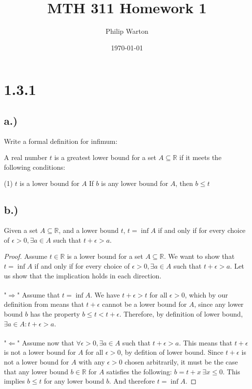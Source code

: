 \documentclass{article}
\begin{document}
\title{MTH 311 Homework 1}
\author{Philip Warton}
\date{\today}
\maketitle
\section*{1.3.1}
\subsection*{a.)}
Write a formal definition for infimum:

A real number $t$ is a greatest lower bound for a set $A \subseteq \mathbb{R}$ if it meets the following conditions:
\begin{tasks}(1)
	\task $t$ is a lower bound for $A$
	\task If $b$ is any lower bound for $A$, then $b \leqslant t$
\end{tasks}

\subsection*{b.)}
Given a set $A \subseteq \mathbb{R}$, and a lower bound $t$, $t = \inf{A}$ if and only if for every choice of $\epsilon > 0, \exists a \in A$ such that $t + \epsilon > a$.

\begin{proof}
Assume $t \in \mathbb{R}$ is a lower bound for a set $A \subseteq \mathbb{R}$. We want to show that $t = \inf{A}$ if and only if for every choice of $\epsilon > 0, \exists a \in A$ such that $t + \epsilon > a$. Let us show that the implication holds in each direction. \\\\
"$\Rightarrow$"
Assume that $t = \inf{A}$. We have $t + \epsilon > t$ for all $\epsilon > 0$, which by our definition from  means that $t + \epsilon$ cannot be a lower bound for $A$, since any lower bound $b$ has the property $b \leqslant t < t + \epsilon$. Therefore, by definition of lower bound, $\exists a \in A : t + \epsilon > a$. \\\\
"$\Leftarrow$"
Assume now that $\forall \epsilon > 0, \exists a \in A$ such that $t + \epsilon > a$. This means that $t + \epsilon$ is not a lower bound for $A$ for all $\epsilon > 0$, by defition of lower bound. Since $t + \epsilon$ is not a lower bound for $A$ with any $\epsilon > 0$ chosen arbitrarily, it must be the case that any lower bound $b \in \mathbb{R}$ for $A$ satisfies the following: $b = t + x \ \exists x \leqslant 0$. This implies $b \leqslant t$ for any lower bound $b$. And therefore $t = \inf{A}$.

\end{proof}
\end{document}
